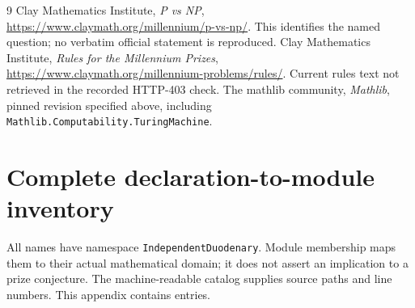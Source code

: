 \documentclass[11pt]{article}
\begin{document}
\begin{thebibliography}{9}
 Clay Mathematics Institute, \emph{P vs NP},
\url{https://www.claymath.org/millennium/p-vs-np/}.
This identifies the named question; no verbatim official statement is reproduced.
 Clay Mathematics Institute, \emph{Rules for the Millennium Prizes},
\url{https://www.claymath.org/millennium-problems/rules/}.
Current rules text not retrieved in the recorded HTTP-403 check.
 The mathlib community, \emph{Mathlib}, pinned revision specified
above, including \texttt{Mathlib.Computability.TuringMachine}.
\end{thebibliography}

\appendix
\section{Complete declaration-to-module inventory}
All names have namespace \texttt{IndependentDuodenary}. Module membership maps
them to their actual mathematical domain; it does not assert an implication to
a prize conjecture. The machine-readable catalog supplies source paths and
line numbers. This appendix contains \AuditedTheoremCount{} entries.

\end{document}
